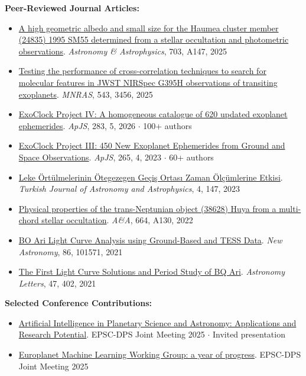 \documentclass[11pt,a4paper]{article}
\begin{document}
\vspace{0.2em}
\textbf{Peer-Reviewed Journal Articles:}
\begin{itemize}
\item \href{https://doi.org/10.1051/0004-6361/202556498}{A high geometric albedo and small size for the Haumea cluster member (24835) 1995 SM55 determined from a stellar occultation and photometric observations}. \textit{Astronomy \& Astrophysics}, 703, A147, 2025

\item \href{https://doi.org/10.1093/mnras/staf1659}{Testing the performance of cross-correlation techniques to search for molecular features in JWST NIRSpec G395H observations of transiting exoplanets}. \textit{MNRAS}, 543, 3456, 2025

\item \href{https://ui.adsabs.harvard.edu/abs/2025arXiv251114407K/abstract}{ExoClock Project IV: A homogeneous catalogue of 620 updated exoplanet ephemerides}. \textit{ApJS}, 283, 5, 2026 $\cdot$ 100+ authors

\item \href{https://doi.org/10.3847/1538-4365/ac9da4}{ExoClock Project III: 450 New Exoplanet Ephemerides from Ground and Space Observations}. \textit{ApJS}, 265, 4, 2023 $\cdot$ 60+ authors

\item \href{https://doi.org/10.55064/tjaa.1203704}{Leke Örtülmelerinin Ötegezegen Geçiş Ortası Zaman Ölçümlerine Etkisi}. \textit{Turkish Journal of Astronomy and Astrophysics}, 4, 147, 2023

\item \href{https://doi.org/10.1051/0004-6361/202141546}{Physical properties of the trans-Neptunian object (38628) Huya from a multi-chord stellar occultation}. \textit{A\&A}, 664, A130, 2022

\item \href{https://doi.org/10.1016/j.newast.2021.101571}{BO Ari Light Curve Analysis using Ground-Based and TESS Data}. \textit{New Astronomy}, 86, 101571, 2021

\item \href{https://doi.org/10.1134/S1063773721060050}{The First Light Curve Solutions and Period Study of BQ Ari}. \textit{Astronomy Letters}, 47, 402, 2021
\end{itemize}

\vspace{0.2em}
\textbf{Selected Conference Contributions:}
\begin{itemize}
\item \href{https://doi.org/10.5194/epsc-dps2025-1467}{Artificial Intelligence in Planetary Science and Astronomy: Applications and Research Potential}. EPSC-DPS Joint Meeting 2025 $\cdot$ Invited presentation

\item \href{https://doi.org/10.5194/epsc-dps2025-1815}{Europlanet Machine Learning Working Group: a year of progress}. EPSC-DPS Joint Meeting 2025
\end{itemize}
\end{document}
